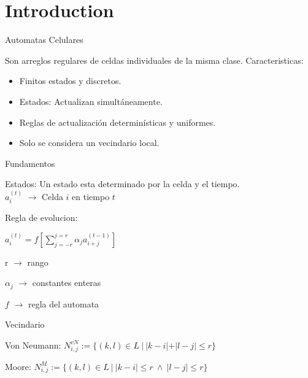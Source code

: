 \section{Introduction}

\begin{frame}{Automatas Celulares}
    \begin{block}{Son arreglos regulares de celdas individuales de la misma clase.}
        Caracteristicas:
        \begin{itemize}
            \item Finitos estados y discretos.
            \item Estados: Actualizan simultáneamente.
            \item Reglas de actualización determinísticas y uniformes.
            \item Solo se considera un vecindario local.
        \end{itemize}
    \end{block}
\end{frame}

\begin{frame}{Fundamentos}
    \begin{block}{Estados:}
        Un estado esta determinado por la celda y el tiempo.
        \\
        $a_{i}^{(t)}$ $\longrightarrow$ Celda $i$ en tiempo $t$

    \end{block}
    \begin{block}{Regla de evolucion:}

        \vspace{1em}

        $a_{i}^{(t)} = f \left[ \sum_{j=-r}^{j=r}  \alpha_{j} a_{i+j}^{(t-1)} \right]$

        \begin{multicols}{3}
            r $\rightarrow$ rango

            $\alpha_j$ $\rightarrow$ constantes enteras

            $f$ $\rightarrow$ regla del automata
        \end{multicols}

    \end{block}
\end{frame}

\begin{frame}{Vecindario}
    \begin{block}{Von Neumann:}
    $N_{i,j}^{vN}:=\{(k,l) \in L\ |\ |k-i|+ |l - j| \leq r\}$
    \end{block}
    \begin{block}{Moore:}
    $N_{i,j}^{M}:=\{(k,l) \in L\ |\ |k-i|\leq r\ \wedge \ |l - j| \leq r \}$
    \end{block}
\end{frame}

